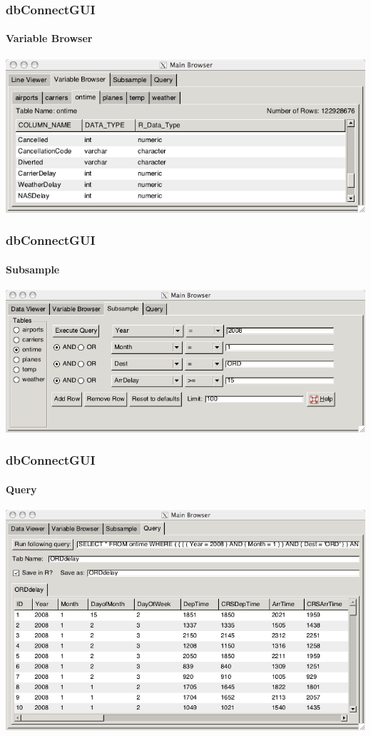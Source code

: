 \documentclass[xcolor=dvipsnames]{beamer}
\begin{document}
\begin{frame}
  \frametitle{dbConnectGUI}
  \framesubtitle{Variable Browser}
  \centering
  \includegraphics[width=.85\linewidth]{./images/db-variablebrowser.png}

\end{frame}

\begin{frame}
  \frametitle{dbConnectGUI}
  \framesubtitle{Subsample}
  \centering
  \includegraphics[width=.85\linewidth]{./images/db-sample.png}

\end{frame}

\begin{frame}
  \frametitle{dbConnectGUI}
  \framesubtitle{Query}
  \centering
  \includegraphics[width=.85\linewidth]{./images/db-query.png}

\end{frame}
\end{document}
